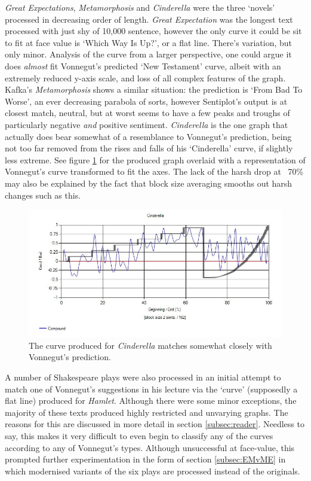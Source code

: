 \documentclass{article}
\begin{document}
{            \textit{Great Expectations}, \textit{Metamorphosis} and \textit{Cinderella} were the three `novels' processed in decreasing order of length. \textit{Great Expectation} was the longest text processed with just shy of 10,000 sentence, however the only curve it could be sit to fit at face value is `Which Way Is Up?', or a flat line. There's variation, but only minor. Analysis of the curve from a larger perspective, one could argue it does \textit{almost} fit Vonnegut's predicted `New Testament' curve, albeit with an extremely reduced y-axis scale, and loss of all complex features of the graph. Kafka's \textit{Metamorphosis} shows a similar situation: the prediction is `From Bad To Worse', an ever decreasing parabola of sorts, however Sentiplot's output is at closest match, neutral, but at worst seems to have a few peaks and troughs of particularly negative \textit{and} positive sentiment. \textit{Cinderella} is the one graph that actually does bear somewhat of a resemblance to Vonnegut's prediction, being not too far removed from the rises and falls of his `Cinderella' curve, if slightly less extreme. See figure \ref{fig:cinderellaComp} for the produced graph overlaid with a representation of Vonnegut's curve transformed to fit the axes. The lack of the harsh drop at ~70\% may also be explained by the fact that block size averaging smooths out harsh changes such as this.
            \begin{figure}[hbtp]
                \includegraphics[width=1\textwidth]{Figures/Curve/CinderellaComp}
                \centering
                \caption{The curve produced for \textit{Cinderella} matches somewhat closely with Vonnegut's prediction.} 
                \label{fig:cinderellaComp}
            \end{figure}
            A number of Shakespeare plays were also processed in an initial attempt to match one of Vonnegut's suggestions in his lecture via the `curve' (supposedly a flat line) produced for \textit{Hamlet}. Although there were some minor exceptions, the majority of these texts produced highly restricted and unvarying graphs. The reasons for this are discussed in more detail in section \ref{subsec:reader}. Needless to say, this makes it very difficult to even begin to classify any of the curves according to any of Vonnegut’s types. Although unsuccessful at face-value, this prompted further experimentation in the form of section \ref{subsec:EMvME} in which modernised variants of the six plays are processed instead of the originals.
}
\end{document}
